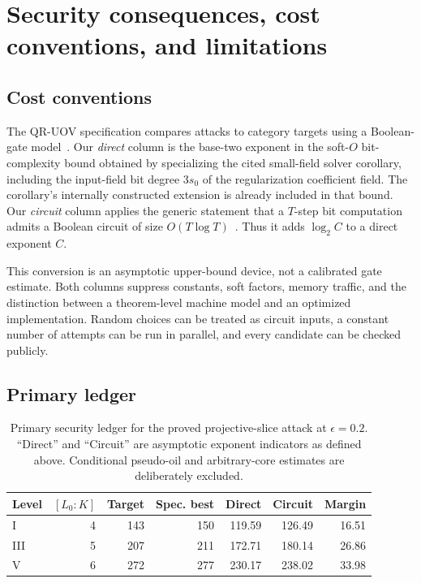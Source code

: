 \documentclass[10pt,a4paper]{article}
\newcommand{\QRUOV}{\textsf{QR-UOV}}
\begin{document}
\section{Security consequences, cost conventions, and limitations}\label{sec:security}

\subsection{Cost conventions}

The \QRUOV{} specification compares attacks to category targets using a Boolean-gate model~\cite{QRUOVSpec}.  Our \emph{direct} column is the base-two exponent in the soft-$O$ bit-complexity bound obtained by specializing the cited small-field solver corollary, including the input-field bit degree $3s_0$ of the regularization coefficient field.  The corollary's internally constructed extension is already included in that bound.  Our \emph{circuit} column applies the generic statement that a $T$-step bit computation admits a Boolean circuit of size $O(T\log T)$~\cite{PippengerFischer}.  Thus it adds $\log_2 C$ to a direct exponent $C$.

This conversion is an asymptotic upper-bound device, not a calibrated gate estimate.  Both columns suppress constants, soft factors, memory traffic, and the distinction between a theorem-level machine model and an optimized implementation.  Random choices can be treated as circuit inputs, a constant number of attempts can be run in parallel, and every candidate can be checked publicly.

\subsection{Primary ledger}

\begin{table}[H]
\centering
\small
\setlength{\tabcolsep}{4pt}
\caption{Primary security ledger for the proved projective-slice attack at $\epsilon=0.2$.  ``Direct'' and ``Circuit'' are asymptotic exponent indicators as defined above.  Conditional pseudo-oil and arbitrary-core estimates are deliberately excluded.}
\label{tab:master}
\begin{tabular}{@{}lrrrrrr@{}}
\toprule
Level & $[L_0:K]$ & Target & Spec. best & Direct & Circuit & Margin\\
\midrule
I   & 4 & 143 & 150 & 119.59 & 126.49 & 16.51\\
III & 5 & 207 & 211 & 172.71 & 180.14 & 26.86\\
V   & 6 & 272 & 277 & 230.17 & 238.02 & 33.98\\
\bottomrule
\end{tabular}
\end{table}
\end{document}
